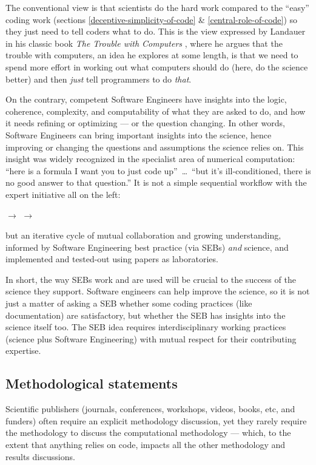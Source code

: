 \documentclass{comjnl}
\begin{document}
The conventional view is that scientists do the hard work compared to the ``easy'' coding work (sections \ref{deceptive-simplicity-of-code} \& \ref{central-role-of-code}) so they just need to tell coders what to do. This is the view expressed by Landauer in his classic book \emph{The Trouble with Computers\/} \cite{landauer,thimbleby-landauer}, where he argues that the trouble with computers, an idea he explores at some length, is that we need to spend more effort in working out what computers should do (here, do the science better) and then \emph{just\/} tell programmers to do \emph{that}.  

On the contrary, competent Software Engineers have insights into the logic, coherence, complexity, and computability of what they are asked to do, and how it needs refining or optimizing --- or the question changing. In other words, Software Engineers can bring important insights into the science, hence improving or changing the questions and assumptions the science relies on. This insight was widely recognized in the specialist area of numerical computation: ``here is a formula I want you to just code up''~\ldots\ ``but it's ill-conditioned, there is no good answer to that question.'' It is not a simple sequential workflow with the expert initiative all on the left:

\begin{center}\sf{} $\rightarrow$  $\rightarrow$ 
\end{center}

\noindent but an iterative cycle of mutual collaboration and growing understanding, informed by Software Engineering best practice (via SEBs) \emph{and\/} science, and implemented and tested-out using papers as laboratories.

In short, the way SEBs work and are used will be crucial to the success of the science they support. Software engineers can help improve the science, so it is not just a matter of asking a SEB whether some coding practices (like documentation) are satisfactory, but whether the SEB has insights into the science itself too. The SEB idea requires interdisciplinary working practices (science plus Software Engineering) with mutual respect for their contributing expertise.

\subsection{Methodological statements}
Scientific publishers (journals, conferences, workshops, videos, books, etc, and funders) often require an explicit methodology discussion, yet they rarely require the methodology to discuss the computational methodology --- which, to the extent that anything relies on code, impacts all the other methodology and results discussions.
\end{document}
